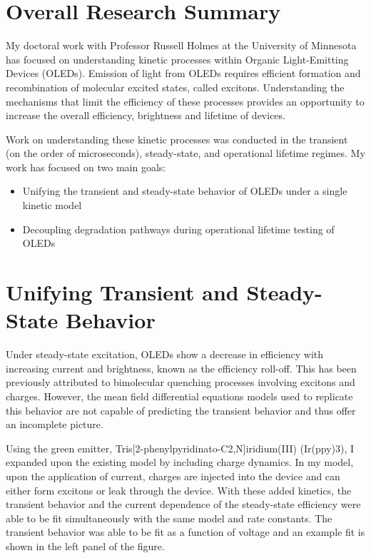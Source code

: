 \documentclass[11pt,a4paper,roman]{moderncv}
\begin{document}
\makecvtitle

\section*{Overall Research Summary}
My doctoral work with Professor Russell Holmes at the University of Minnesota has focused on understanding kinetic processes within Organic Light-Emitting Devices (OLEDs).  Emission of light from OLEDs requires efficient formation and recombination of molecular excited states, called excitons.  Understanding the mechanisms that limit the efficiency of these processes provides an opportunity to increase the overall efficiency, brightness and lifetime of devices.

Work on understanding these kinetic processes was conducted in the transient  (on the order of microseconds), steady-state, and operational lifetime regimes.  My work has focused on two main goals:

\begin{itemize}
\item Unifying the transient and steady-state behavior of OLEDs under a single kinetic model
\item Decoupling degradation pathways during operational lifetime testing of OLEDs
\end{itemize}

\section*{Unifying Transient and Steady-State Behavior}

Under steady-state excitation, OLEDs show a decrease in efficiency with increasing current and brightness, known as the efficiency roll-off.  This has been previously attributed to bimolecular quenching processes involving excitons and charges.  However, the mean field differential equations models used to replicate this behavior are not capable of predicting the transient behavior and thus offer an incomplete picture.  

Using the green emitter, Tris[2-phenylpyridinato-C2,N]iridium(III) (Ir(ppy)3), I expanded upon the existing model by including charge dynamics.  In my model, upon the application of current, charges are injected into the device and can either form excitons or leak through the device.  With these added kinetics, the transient behavior and the current dependence of the steady-state efficiency were able to be fit simultaneously with the same model and rate constants.  The transient behavior was able to be fit as a function of voltage and an example fit is shown in the left panel of the figure.  
\end{document}
